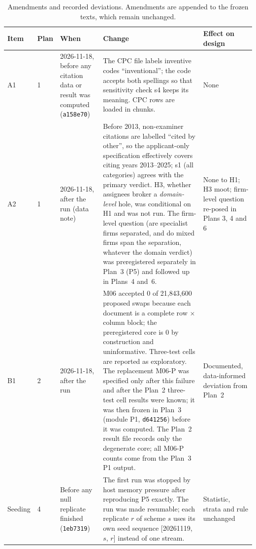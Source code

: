 \begin{table}[tbp]
\centering
\caption{Amendments and recorded deviations. Amendments are appended to the frozen texts, which remain unchanged.}
\label{tab:app_amend}
\footnotesize
\setlength{\tabcolsep}{4pt}
\begin{tabular}{p{1.3cm}p{1.2cm}p{2.6cm}p{6.4cm}p{3.1cm}}
\toprule
Item & Plan & When & Change & Effect on design \tabularnewline
\midrule
\raggedright A1 & \raggedright 1 & \raggedright 2026-11-18, before any citation data or result was computed (\texttt{a158e70}) & \raggedright The CPC file labels inventive codes ``inventional''; the code accepts both spellings so that sensitivity check s4 keeps its meaning. CPC rows are loaded in chunks. & \raggedright None \tabularnewline
\addlinespace
\raggedright A2 & \raggedright 1 & \raggedright 2026-11-18, after the run (data note) & \raggedright Before 2013, non-examiner citations are labelled ``cited by other'', so the applicant-only specification effectively covers citing years 2013--2025; s1 (all categories) agrees with the primary verdict. H3, whether assignees broker a \emph{domain-level} hole, was conditional on H1 and was not run. The firm-level question (are specialist firms separated, and do mixed firms span the separation, whatever the domain verdict) was preregistered separately in Plan~3 (P5) and followed up in Plans~4 and~6. & \raggedright None to H1; H3 moot; firm-level question re-posed in Plans 3, 4 and 6 \tabularnewline
\addlinespace
\raggedright B1 & \raggedright 2 & \raggedright 2026-11-18, after the run & \raggedright M06 accepted 0 of 21,843,600 proposed swaps because each document is a complete row $\times$ column block; the preregistered core is 0 by construction and uninformative. Three-test cells are reported as exploratory. The replacement M06-P was specified only after this failure and after the Plan~2 three-test cell results were known; it was then frozen in Plan~3 (module P1, \texttt{d641256}) before it was computed. The Plan~2 result file records only the degenerate core; all M06-P counts come from the Plan~3 P1 output. & \raggedright Documented, data-informed deviation from Plan~2 \tabularnewline
\addlinespace
\raggedright Seeding & \raggedright 4 & \raggedright Before any null replicate finished (\texttt{1eb7319}) & \raggedright The first run was stopped by host memory pressure after reproducing P5 exactly. The run was made resumable; each replicate $r$ of scheme $s$ uses its own seed sequence [20261119, $s$, $r$] instead of one stream. & \raggedright Statistic, strata and rule unchanged \tabularnewline

\end{tabular}
\end{table}
